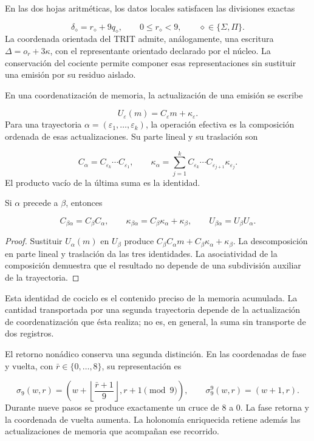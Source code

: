 En las dos hojas aritméticas, los datos locales satisfacen las divisiones exactas

\[
\delta_\diamond=r_\diamond+9q_\diamond,
\qquad 0\leq r_\diamond<9,
\qquad \diamond\in\{\Sigma,\Pi\}.
\]
La coordenada orientada del TRIT admite, análogamente, una escritura \(\Delta=o_r+3\kappa\), con el representante orientado declarado por el núcleo. La conservación del cociente permite componer esas representaciones sin sustituir una emisión por su residuo aislado.

En una coordenatización de memoria, la actualización de una emisión se escribe

\[
U_\varepsilon(m)=C_\varepsilon m+\kappa_\varepsilon.
\]
Para una trayectoria \(\alpha=(\varepsilon_1,\ldots,\varepsilon_k)\), la operación efectiva es la composición ordenada de esas actualizaciones. Su parte lineal y su traslación son

\[
C_\alpha=C_{\varepsilon_k}\cdots C_{\varepsilon_1},
\qquad
\kappa_\alpha=
\sum_{j=1}^{k}C_{\varepsilon_k}\cdots
C_{\varepsilon_{j+1}}\kappa_{\varepsilon_j}.
\]
El producto vacío de la última suma es la identidad.

\begin{proposition}
\label{hmtfg:base:prop:continuo-compatibilidad-afin}
Si \(\alpha\) precede a \(\beta\), entonces

\[
C_{\beta\alpha}=C_\beta C_\alpha,
\qquad
\kappa_{\beta\alpha}=C_\beta\kappa_\alpha+\kappa_\beta,
\qquad
U_{\beta\alpha}=U_\beta U_\alpha.
\]
\end{proposition}
\begin{proof}
Sustituir \(U_\alpha(m)\) en \(U_\beta\) produce \(C_\beta C_\alpha m+C_\beta\kappa_\alpha+\kappa_\beta\). La descomposición en parte lineal y traslación da las tres identidades. La asociatividad de la composición demuestra que el resultado no depende de una subdivisión auxiliar de la trayectoria.
\end{proof}

Esta identidad de cociclo es el contenido preciso de la memoria acumulada. La cantidad transportada por una segunda trayectoria depende de la actualización de coordenatización que ésta realiza; no es, en general, la suma sin transporte de dos registros.

El retorno nonádico conserva una segunda distinción. En las coordenadas de fase y vuelta, con \(\bar r\in\{0,\ldots,8\}\), su representación es

\[
\sigma_9(w,r)=
\left(w+\left\lfloor\frac{\bar r+1}{9}\right\rfloor,
r+1\pmod9\right),
\qquad
\sigma_9^9(w,r)=(w+1,r).
\]
Durante nueve pasos se produce exactamente un cruce de \(8\) a \(0\). La fase retorna y la coordenada de vuelta aumenta. La holonomía enriquecida retiene además las actualizaciones de memoria que acompañan ese recorrido.

